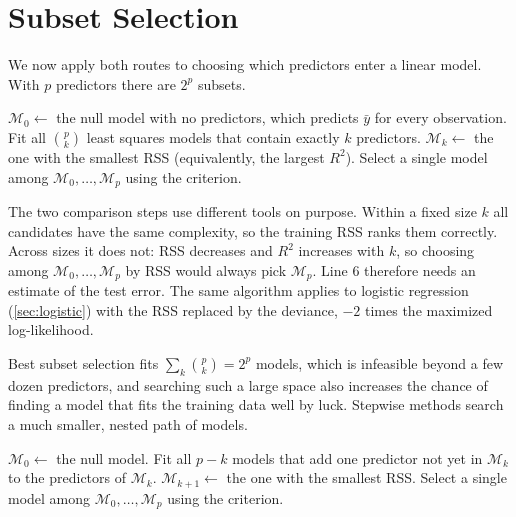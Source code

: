 \section{Subset Selection}\label{sec:subset}

We now apply both routes to choosing which predictors enter a linear model. With $p$ predictors there are $2^p$ subsets.

\begin{algorithm}[H]
\caption{Best Subset Selection}\label{alg:best-subset}
\begin{algorithmic}[1]
\State $\mathcal{M}_0\gets$ the null model with no predictors, which predicts $\bar y$ for every observation.
  \State Fit all $\binom pk$ least squares models that contain exactly $k$ predictors.
  \State $\mathcal{M}_k\gets$ the one with the smallest RSS (equivalently, the largest $R^2$).
\EndFor
\State Select a single model among $\mathcal{M}_0,\dots,\mathcal{M}_p$ using the criterion.
\end{algorithmic}
\end{algorithm}

The two comparison steps use different tools on purpose. Within a fixed size $k$ all candidates have the same complexity, so the training RSS ranks them correctly. Across sizes it does not: RSS decreases and $R^2$ increases with $k$, so choosing among $\mathcal{M}_0,\dots,\mathcal{M}_p$ by RSS would always pick $\mathcal{M}_p$. Line 6 therefore needs an estimate of the test error. The same algorithm applies to logistic regression (\cref{sec:logistic}) with the RSS replaced by the deviance, $-2$ times the maximized log-likelihood.

Best subset selection fits $\sum_k\binom pk=2^p$ models, which is infeasible beyond a few dozen predictors, and searching such a large space also increases the chance of finding a model that fits the training data well by luck. Stepwise methods search a much smaller, nested path of models.

\begin{algorithm}[H]
\caption{Forward Stepwise Selection}\label{alg:forward-stepwise}
\begin{algorithmic}[1]
\State $\mathcal{M}_0\gets$ the null model.
  \State Fit all $p-k$ models that add one predictor not yet in $\mathcal{M}_k$ to the predictors of $\mathcal{M}_k$.
  \State $\mathcal{M}_{k+1}\gets$ the one with the smallest RSS.
\EndFor
\State Select a single model among $\mathcal{M}_0,\dots,\mathcal{M}_p$ using the criterion.
\end{algorithmic}
\end{algorithm}

